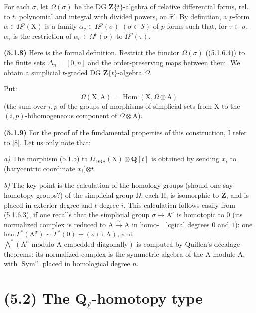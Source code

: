 \documentclass[11pt,leqno]{article}
\newcommand{\Page}[1]{\ifvmode\noindent\else\unskip\ \fi{\footnotesize\textcolor{gray}{[p.\,#1]}}\ \ignorespaces}
\begin{document}
For each \(\sigma\), let \(\Omega(\sigma)\) be the DG \(\mathbf{Z}\{t\}\)-algebra of relative differential forms, rel. to \(t\), polynomial and integral with divided powers, on \(\hat{\sigma}'\). By definition, a \(p\)-form \(\alpha\in\Omega^p(\mathrm{X})\) is a family \(\alpha_{\sigma}\in\Omega^p(\sigma)\) \((\sigma\in\mathcal{S})\) of \(p\)-forms such that, for \(\tau\subset\sigma\), \(\alpha_{\tau}\) is the restriction of \(\alpha_{\sigma}\in\Omega^p(\sigma)\) to \(\Omega^p(\tau)\).

\textbf{(5.1.8)} Here is the formal definition. Restrict the functor \(\Omega(\sigma)\) ((5.1.6.4)) to the finite sets \(\Delta_n=[0,n]\) and the order-preserving maps between them. We obtain a simplicial \(t\)-graded DG \(\mathbf{Z}\{t\}\)-algebra \(\Omega\).

Put:
\[
\Omega(\mathrm{X},\mathrm{A})=\operatorname{Hom}(\mathrm{X},\Omega\otimes\mathrm{A})
\]
(the sum over \(i,p\) of the groups of morphisms of simplicial sets from \(\mathrm{X}\) to the \((i,p)\)-bihomogeneous component of \(\Omega\otimes\mathrm{A}\)).

\textbf{(5.1.9)} For the proof of the fundamental properties of this construction, I refer to [8]. Let us only note that:

\textit{a)} The morphism (5.1.5) to \(\Omega_{\mathrm{DRS}}(\mathrm{X})\otimes\mathbf{Q}[t]\) is obtained by sending \(x_i\) to (barycentric coordinate \(x_i\))\(\otimes t\).

\textit{b)} The key point is the calculation of the homology groups (should one say homotopy groups?) of the simplicial group \(\Omega\): each \(\mathrm{H}_i\) is isomorphic to \(\mathbf{Z}\), and is placed in exterior degree and \(t\)-degree \(i\). This calculation follows easily from (5.1.6.3), if one recalls that the simplicial group \(\sigma\mapsto\mathrm{A}^{\sigma}\) is homotopic to \(0\) (its normalized complex is reduced to \(\mathrm{A}\xrightarrow{\sim}\mathrm{A}\) in homo-\Page{237}logical degrees \(0\) and \(1\)): one has \(\Gamma^*(\mathrm{A}^{\sigma})\sim\Gamma^*(0)=(\sigma\mapsto\mathrm{A})\), and \(\bigwedge\limits^{*}(\mathrm{A}^{\sigma}\text{ modulo }\mathrm{A}\text{ embedded diagonally})\) is computed by Quillen's décalage theorems: its normalized complex is the symmetric algebra of the \(\mathrm{A}\)-module \(\mathrm{A}\), with \(\operatorname{Sym}^n\) placed in homological degree \(n\).

\section*{(5.2) The \(\mathbf{Q}_{\ell}\)-homotopy type}
\end{document}
